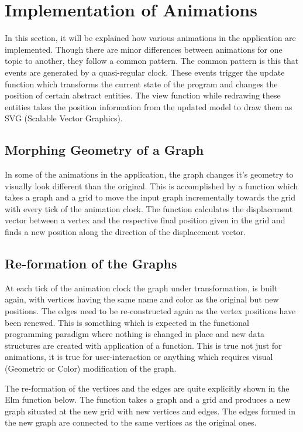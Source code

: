\section{Implementation of Animations}
In this section, it will be explained how various animations in the
application are implemented. Though there are minor differences between animations
for one topic to another, they follow a common pattern. The common pattern is
this that events are generated by a quasi-regular clock. These events trigger
the update function which transforms the current state of the program and
changes the position of certain abstract entities. The view function while
redrawing these entities takes the position information from the updated model
to draw them as SVG (Scalable Vector Graphics).

\subsection{Morphing Geometry of a Graph}
In some of the animations in the application, the graph changes it's geometry
to visually look different than the original. This is accomplished by a
function which takes a graph and a grid to move the input graph incrementally
towards the grid with every tick of the animation clock. The function
calculates the displacement vector between a vertex and the respective final
position given in the grid and finds a new position along the direction of the
displacement vector.

\subsection{Re-formation of the Graphs}
At each tick of the animation clock the graph under transformation, is built
again, with vertices having the same name and color as the original but new
positions. The edges need to be re-constructed again as the vertex positions
have been renewed. This is something which is expected in the functional
programming paradigm where nothing is changed in place and new data structures
are created with application of a function. This is true not just for
animations, it is true for user-interaction or anything which requires visual
(Geometric or Color) modification of the graph.

The re-formation of the vertices and the edges are quite explicitly shown in
the Elm function below. The function takes a graph and a grid and produces a
new graph situated at the new grid with new vertices and edges.  The edges
formed in the new graph are connected to the same vertices as the original
ones.

